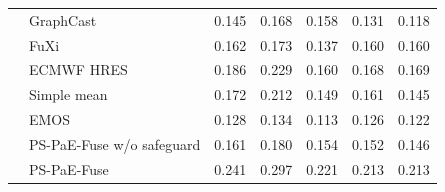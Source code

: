 \begin{tabular}{llccccc}
 & GraphCast & 0.145 & 0.168 & 0.158 & 0.131 & 0.118 \\
 & FuXi & 0.162 & 0.173 & 0.137 & 0.160 & 0.160 \\
 & ECMWF HRES & 0.186 & 0.229 & 0.160 & 0.168 & 0.169 \\
 & Simple mean & 0.172 & 0.212 & 0.149 & 0.161 & 0.145 \\
 & EMOS & 0.128 & 0.134 & 0.113 & 0.126 & 0.122 \\
 & PS-PaE-Fuse w/o safeguard & 0.161 & 0.180 & 0.154 & 0.152 & 0.146 \\
 & PS-PaE-Fuse & 0.241 & 0.297 & 0.221 & 0.213 & 0.213 \\
\hline
\end{tabular}
